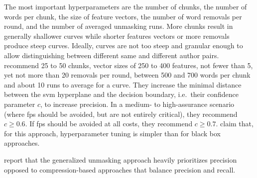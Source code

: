 The most important hyperparameters are the number of chunks, the number of words per chunk, the size of feature vectors, 
the number of word removals per round, and the number of averaged unmasking runs.
More chunks result in generally shallower curves while shorter features vectors or more removals produce steep curves.
Ideally, curves are not too steep and granular enough to allow distinguishing between different same and different author pairs.
\citet{bevendorff_bias_2019} recommend 25 to 50 chunks, vector sizes of 250 to 400 features, not fewer than 5, yet not more than 20 removals per round, 
between 500 and 700 words per chunk and about 10 runs to average for a curve.
They increase the minimal distance between the \ac{svm} hyperplane and the decision boundary, i.e.\ their confidence parameter $c$, to increase precision.
In a medium- to high-assurance scenario (where \acp{fp} should be avoided, but are not entirely critical), they recommend $c \geq 0.6$.
If \acp{fp} should be avoided at all costs, they recommend $c \geq 0.7$.
\citet{bevendorff_bias_2019} claim that, for this approach, hyperparameter tuning is simpler than for black box approaches.

\citet{bevendorff_bias_2019} report that the generalized unmasking approach heavily prioritizes precision 
opposed to compression-based approaches that balance precision and recall.
    